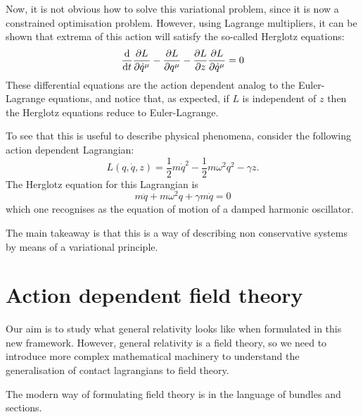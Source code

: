 \documentclass[../main.tex]{subfiles}
\begin{document}
Now, it is not obvious how to solve this variational problem, since it is now a
constrained optimisation problem. However, using Lagrange multipliers, it can be shown
that extrema of this action will satisfy the so-called Herglotz equations:
\begin{equation}\label{eq:herglotz}
 	\frac{\mathrm{d}}{\mathrm{d} t}\frac{\partial L}{\partial \dot{q}^\mu} - \frac{\partial L}{\partial
 	q^\mu} - \frac{\partial L}{\partial z} \frac{\partial L}{\partial \dot{q}^\mu} = 0
\end{equation}
These differential equations are the action dependent analog to the Euler-Lagrange
equations, and notice that, as expected, if \( L \) is independent of \( z \) then the
Herglotz equations reduce to Euler-Lagrange. 

To see that this is useful to describe physical phenomena, consider the following action
dependent Lagrangian:
\begin{equation*}
	L(q, \dot{q}, z) = \frac{1}{2}m\dot{q}^2 - \frac{1}{2}m\omega^2 q^2 - \gamma z. 
\end{equation*}
The Herglotz equation for this Lagrangian is
\begin{equation*}
	m\ddot{q} + m\omega^2 q + \gamma m \dot{q} = 0  
\end{equation*}
which one recognises as the equation of motion of a damped harmonic oscillator.

The main takeaway is that this is a way of describing non conservative systems by means of
a variational principle. 

\section{Action dependent field theory}
Our aim is to study what general relativity looks like when formulated in this new
framework. However, general relativity is a field theory, so we need to introduce more
complex mathematical machinery to understand the generalisation of contact lagrangians to
field theory. 

The modern way of formulating field theory is in the language of bundles and
sections. 
\end{document}
